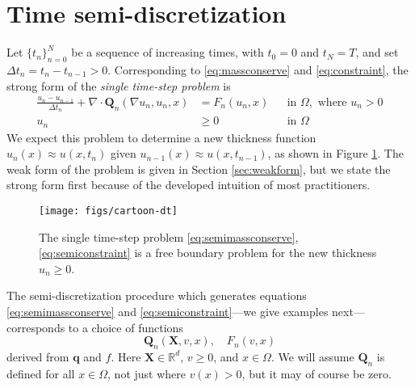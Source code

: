 \documentclass[final,onefignum]{siamart190516}
\newcommand\bq{\mathbf{q}}
\newcommand\bQ{\mathbf{Q}}
\newcommand\bX{\mathbf{X}}
\newcommand{\Div}{\nabla\cdot}
\newcommand{\grad}{\nabla}
\newcommand\RR{\mathbb{R}}
\begin{document}
\section{Time semi-discretization}  \label{sec:strongform}

Let $\{t_n\}_{n=0}^N$ be a sequence of increasing times, with $t_0=0$ and $t_N=T$, and set $\Delta t_n = t_n-t_{n-1}>0$.  Corresponding to \eqref{eq:massconserve} and \eqref{eq:constraint}, the strong form of the \emph{single time-step problem} is
\begin{align}
\frac{u_n - u_{n-1}}{\Delta t_n} + \Div \bQ_n(\grad u_n,u_n,x) &= F_n(u_n,x) &&\text{in } \Omega, \text{ where } u_n > 0 \label{eq:semimassconserve} \\
u_n &\ge 0 &&\text{in } \Omega \label{eq:semiconstraint}
\end{align}
We expect this problem to determine a new thickness function $u_n(x) \approx u(x,t_n)$ given $u_{n-1}(x) \approx u(x,t_{n-1})$, as shown in Figure \ref{fig:timestepcartoon}.  The weak form of the problem is given in Section \ref{sec:weakform}, but we state the strong form first because of the developed intuition of most practitioners.

\begin{figure}[ht]
\begin{center}
\texttt{[image: figs/cartoon-dt]}
\end{center}
\caption{The single time-step problem \eqref{eq:semimassconserve}, \eqref{eq:semiconstraint} is a free boundary problem for the new thickness $u_n\ge 0$.}
\label{fig:timestepcartoon}
\end{figure}

The semi-discretization procedure which generates equations \eqref{eq:semimassconserve} and \eqref{eq:semiconstraint}---we give examples next---corresponds to a choice of functions
\begin{equation}
\bQ_n(\bX,v,x), \quad F_n(v,x) \label{eq:functionalforms}
\end{equation}
derived from $\bq$ and $f$.  Here $\bX\in\RR^d$, $v\ge 0$, and $x\in \Omega$.  We will assume $\bQ_n$ is defined for all $x\in\Omega$, not just where $v(x)>0$, but it may of course be zero.
\end{document}
